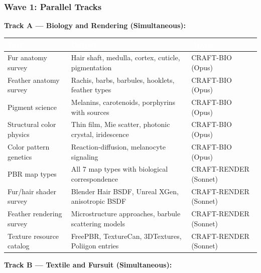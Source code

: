 \documentclass[11pt,letterpaper]{article}
\newcommand{\tableheader}[1]{\textbf{\sffamily\textcolor{white}{#1}}}
\begin{document}
\subsubsection{Wave 1: Parallel Tracks}

\textbf{Track A --- Biology and Rendering (Simultaneous):}

\begin{center}
\begin{tabularx}{\textwidth}{L{3.5cm}XC{2cm}}
\toprule
{}
\tableheader{Task} & \tableheader{Output} & \tableheader{Agent} \\
\midrule
Fur anatomy survey & Hair shaft, medulla, cortex, cuticle, pigmentation & CRAFT-BIO (Opus) \\
Feather anatomy survey & Rachis, barbs, barbules, hooklets, feather types & CRAFT-BIO (Opus) \\
Pigment science & Melanins, carotenoids, porphyrins with sources & CRAFT-BIO (Opus) \\
Structural color physics & Thin film, Mie scatter, photonic crystal, iridescence & CRAFT-BIO (Opus) \\
Color pattern genetics & Reaction-diffusion, melanocyte signaling & CRAFT-BIO (Opus) \\
PBR map types & All 7 map types with biological correspondence & CRAFT-RENDER (Sonnet) \\
Fur/hair shader survey & Blender Hair BSDF, Unreal XGen, anisotropic BSDF & CRAFT-RENDER (Sonnet) \\
Feather rendering survey & Microstructure approaches, barbule scattering models & CRAFT-RENDER (Sonnet) \\
Texture resource catalog & FreePBR, TextureCan, 3DTextures, Poliigon entries & CRAFT-RENDER (Sonnet) \\
\bottomrule
\end{tabularx}
\end{center}

\textbf{Track B --- Textile and Fursuit (Simultaneous):}
\end{document}
